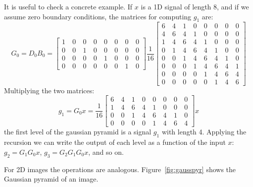 It is useful to check a concrete example. If $x$ is a 1D signal of length 8, and if we assume zero boundary conditions, the matrices for computing $g_1$ are:
\begin{equation}
	G_0 = D_0 B_0 =
	\begin{bmatrix}
		1 ~ & 0 ~ & 0 ~ & 0 ~ & 0 ~ & 0 ~ & 0 ~ & 0 \\
		0 ~ & 0 ~ & 1 ~ & 0 ~ & 0 ~ & 0 ~ & 0 ~ & 0 \\
		0 ~ & 0 ~ & 0 ~ & 0 ~ & 1 ~ & 0 ~ & 0 ~ & 0 \\
		0 ~ & 0 ~ & 0 ~ & 0 ~ & 0 ~ & 0 ~ & 1 ~ & 0
	\end{bmatrix}
	\frac{1}{16}
	\begin{bmatrix}
		6 ~ & 4 ~ & 1 ~ & 0 ~ & 0 ~ & 0 ~ & 0 ~ & 0 \\
		4 ~ & 6 ~ & 4 ~ & 1 ~ & 0 ~ & 0 ~ & 0 ~ & 0 \\
		1 ~ & 4 ~ & 6 ~ & 4 ~ & 1 ~ & 0 ~ & 0 ~ & 0 \\
		0 ~ & 1 ~ & 4 ~ & 6 ~ & 4 ~ & 1 ~ & 0 ~ & 0 \\
		0 ~ & 0 ~ & 1 ~ & 4 ~ & 6 ~ & 4 ~ & 1 ~ & 0 \\
		0 ~ & 0 ~ & 0 ~ & 1 ~ & 4 ~ & 6 ~ & 4 ~ & 1 \\
		0 ~ & 0 ~ & 0 ~ & 0 ~ & 1 ~ & 4 ~ & 6 ~ & 4 \\
		0 ~ & 0 ~ & 0 ~ & 0 ~ & 0 ~ & 1 ~ & 4 ~ & 6
	\end{bmatrix}
\end{equation}
Multiplying the two matrices:
\begin{equation}
	g_{1} = G_0 x =
	\frac{1}{16}
	\begin{bmatrix}
		6 ~ & 4 ~ & 1 ~ & 0 ~ & 0 ~ & 0 ~ & 0 ~ & 0 \\
		1 ~ & 4 ~ & 6 ~ & 4 ~ & 1 ~ & 0 ~ & 0 ~ & 0 \\
		0 ~ & 0 ~ & 1 ~ & 4 ~ & 6 ~ & 4 ~ & 1 ~ & 0 \\
		0 ~ & 0 ~ & 0 ~ & 0 ~ & 1 ~ & 4 ~ & 6 ~ & 4
	\end{bmatrix}
	x
\end{equation}
the first level of the gaussian pyramid is a signal $g_1$ with length 4. Applying the recursion we can write the output of each level as a function of the input $x$:  $g_{2} = G_1 G_0 x$, $g_{3} = G_2 G_1 G_0 x$, and so on.

For 2D images the operations are analogous. Figure~\ref{fig:gausspyr} shows the Gaussian pyramid of an image.


